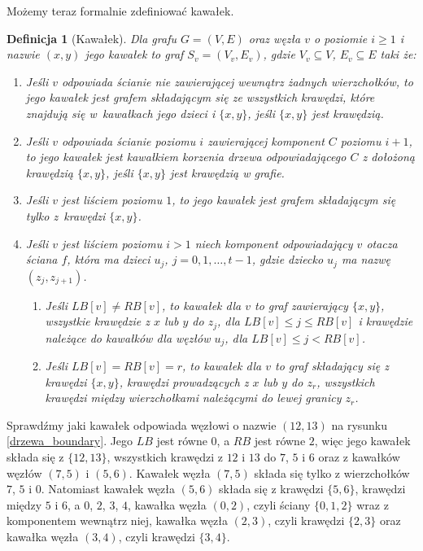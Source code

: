 \documentclass[twoside,a4paper,12pt]{report} %
\theoremstyle{break}
\newtheorem{definition}{Definicja}[section]
\begin{document}
Możemy teraz formalnie zdefiniować kawałek. 
\begin{definition}[Kawałek]
Dla grafu $G=(V,E)$ oraz węzła $v$ o poziomie $i \ge 1$ i nazwie $(x,y)$ jego kawałek to graf $S_v=(V_v, E_v)$, gdzie $V_v \subseteq V$, $E_v \subseteq E$ taki że:
\begin{enumerate}
    \item Jeśli $v$ odpowiada ścianie nie zawierającej wewnątrz żadnych wierzchołków, to jego kawałek jest grafem składającym się ze wszystkich krawędzi, które znajdują się w~kawałkach jego dzieci i $\{x,y\}$, jeśli $\{x,y\}$ jest krawędzią.
    \item Jeśli $v$ odpowiada ścianie poziomu $i$ zawierającej komponent $C$ poziomu $i+1$, to jego kawałek jest kawałkiem korzenia drzewa odpowiadającego $C$ z dołożoną krawędzią $\{x, y\}$, jeśli $\{x,y\}$ jest krawędzią w grafie.
    \item Jeśli $v$ jest liściem poziomu $1$, to jego kawałek jest grafem składającym się tylko z~krawędzi $\{x, y\}$.
    \item Jeśli $v$ jest liściem poziomu $i > 1$ niech komponent odpowiadający $v$ otacza ściana $f$, która ma dzieci $u_j$, $j = 0, 1, \ldots, t - 1$, gdzie dziecko $u_j$ ma nazwę $(z_j, z_{j+1})$. 
    \begin{enumerate}
        \item Jeśli $LB[v]\ne RB[v]$, to kawałek dla $v$ to graf zawierający $\{x,y\}$, wszystkie krawędzie z $x$ lub $y$ do $z_j$, dla $LB[v] \le j \le RB[v]$ i krawędzie należące do kawałków dla węzłów $u_j$, dla $LB[v] \le j < RB[v]$.
        \item Jeśli $LB[v] = RB[v] = r$, to kawałek dla $v$ to graf składający się z krawędzi $\{x,y\}$, krawędzi prowadzących z $x$ lub $y$ do $z_r$, wszystkich krawędzi między wierzchołkami należącymi do lewej granicy $z_r$.
    \end{enumerate}
\end{enumerate}
\end{definition}

Sprawdźmy jaki kawałek odpowiada węzłowi o nazwie $(12,13)$ na rysunku \ref{drzewa_boundary}. Jego $LB$ jest równe $0$, a $RB$ jest równe $2$, więc jego kawałek składa się z $\{12,13\}$, wszystkich krawędzi z $12$ i $13$ do $7$, $5$ i $6$ oraz z kawałków węzłów $(7,5)$ i $(5,6)$. Kawałek węzła $(7,5)$ składa się tylko z wierzchołków $7$, $5$ i $0$. Natomiast kawałek węzła $(5,6)$ składa się z krawędzi $\{5,6\}$, krawędzi między $5$ i $6$, a $0$, $2$, $3$, $4$, kawałka węzła $(0,2)$, czyli ściany $\{0,1,2\}$ wraz z komponentem wewnątrz niej, kawałka węzła $(2,3)$, czyli krawędzi $\{2,3\}$ oraz kawałka węzła $(3,4)$, czyli krawędzi $\{3,4\}$.
\end{document}

